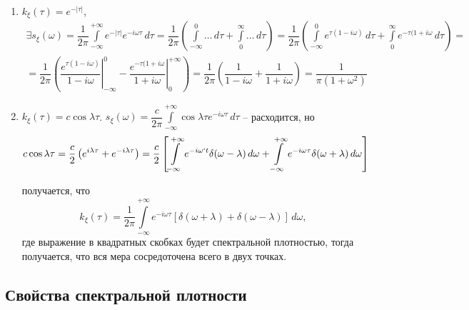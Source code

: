 \begin{ex}
  \begin{enumerate}
    \item $k_\xi(\tau) = e^{-|\tau|}$,
      \begin{multline*}
        \exists s_\xi(\omega) =
        \dfrac{1}{2\pi} \int\limits_{-\infty}^{+\infty} e^{-|\tau|} e^{-i\omega\tau} \, d\tau =
        \dfrac{1}{2\pi} \left( \int\limits_{-\infty}^0 \dots \, d\tau + \int\limits_{0}^{\infty} \dots \, d\tau \right) =
        \dfrac{1}{2\pi} \left( \int\limits_{-\infty}^0 e^{\tau(1 - i\omega)} \, d\tau +
        \int\limits_{0}^\infty e^{-\tau(1+i\omega} \, d\tau \right) = \\
        =
        \dfrac{1}{2\pi} \left(
          \left. \dfrac{e^{\tau (1-i\omega)}}{1 - i\omega} \right|_{-\infty}^0 -
          \left. \dfrac{e^{-\tau(1+i\omega}}{1+i\omega} \right|_{0}^{+\infty} \right) 
        = \dfrac{1}{2\pi} \left( \dfrac{1}{1 - i\omega} + \dfrac{1}{1+i\omega} \right) 
        = \dfrac{1}{\pi (1+\omega^2)}
      \end{multline*}

    \item $k_\xi(\tau) = c \cos \lambda\tau$.
      $s_\xi(\omega) = \dfrac{c}{2\pi}\int\limits_{-\infty}^{+\infty} \cos\lambda\tau e^{-i\omega\tau} \, d\tau$ --
      расходится, но
      \[
        c \cos\lambda\tau = \dfrac{c}{2} \left( e^{i\lambda\tau} + e^{-i\lambda\tau} \right) =
        \dfrac{c}{2} \left[ \int\limits_{-\infty}^{+\infty} e^{-i\omega`t} \delta(\omega-\lambda) \, d\omega
        + \int\limits_{-\infty}^{+\infty} e^{- i\omega \tau} \delta(\omega+\lambda) \, d\omega \right]
      \]

      получается, что 
      \[
        k_\xi(\tau) = \dfrac{1}{2\pi} \int\limits_{-\infty}^{+\infty} e^{-i\omega\tau} \left[ \delta(\omega+\lambda) + \delta(\omega-\lambda) \right] \, d\omega,
      \]
      где выражение в квадратных скобках будет спектральной плотностью,
      тогда получается, что вся мера сосредоточена всего в двух точках.
  \end{enumerate}
\end{ex}

\subsection{Свойства спектральной плотности}

